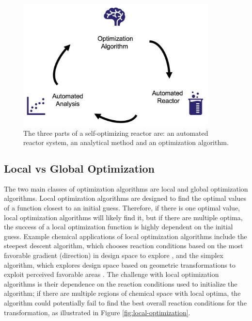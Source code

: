 \begin{figure}
    \centering
    \includegraphics[width=0.9\textwidth]{gfx/Chapter03/self-optimization-cycle.png}
    \caption{The three parts of a self-optimizing reactor are: an automated reactor system, an analytical method and an optimization algorithm.}
    \label{fig:optimization-cycle}
\end{figure}

\subsection{Local vs Global Optimization}
The two main classes of optimization algorithms are local and global optimization algorithms. Local optimization algorithms are designed to find the optimal values of a function closest to an initial guess. Therefore, if there is one optimal value, local optimization algorithms will likely find it, but if there are multiple optima, the success of a local optimization function is highly dependent on the initial guess. Example chemical applications of local optimization algorithms include the steepest descent algorithm, which chooses reaction conditions based on the most favorable gradient (direction) in design space to explore \cite{McMullen2010a}, and the simplex algorithm, which explores design space based on geometric transformations to exploit perceived favorable areas \cite{Routh1977, Bourne2011}. The challenge with local optimization algorithms is their dependence on the reaction conditions used to initialize the algorithm; if there are multiple regions of chemical space with local optima, the algorithm could potentially fail to find the best overall reaction conditions for the transformation, as illustrated in Figure \ref{fig:local-optimization}.

